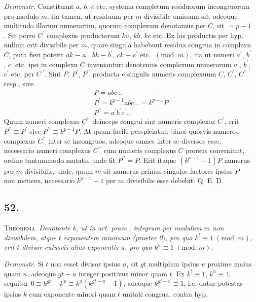 \documentclass[twoside,12pt]{memoir}
\renewcommand{\pmod}[1]{\;(\textrm{mod.}\;#1)}
\begin{document}
\textit{Demonstr.} Constituant \(a\), \(b\), \(c\) etc. systema completum residuorum incongruorum pro modulo \(m\), ita tamen, ut residuum per \(m\) divisibile omissum sit, adeoque multitudo illorum numerorum, quorum complexum denotamus per \(C\), sit \(=p-1\). Sit porro \(C^{\prime}\) complexus productorum \(k a\), \(k b\), \(k c\) etc. Ex his productis per hyp. nullum erit divisibile per \(m\), quare singula habebunt residua congrua in complexu \(C\), puta fieri poterit \(a k \equiv a^{\prime}\), \(b k \equiv b^{\prime}\), \(c k \equiv c^{\prime}\) etc. \(\pmod{m}\), ita ut numeri \(a^{\prime}\), \(b^{\prime}\), \(c^{\prime}\) etc. ipsi in complexu \(C\) inveniantur: denotemus complexum numerorum \(a^{\prime}\), \(b^{\prime}\), \(c^{\prime}\) etc. per \(C^{\prime \prime}\). Sint \(P\), \(P^{\prime}\), \(P^{\prime \prime}\) producta e singulis numeris complexuum \(C\), \(C^{\prime}\), \(C^{\prime \prime}\) resp., sive
\[\begin{aligned}
& P=a b c \ldots \\
& P^{\prime}=k^{p-1} a b c \ldots=k^{p-1} P \\
& P^{\prime \prime}=a^{\prime} b^{\prime} c^{\prime} \ldots
\end{aligned}\]
Quum numeri complexus \(C^{\prime \prime}\) deinceps congrui sint numeris complexus \(C^{\prime}\), erit \(P^{\prime \prime} \equiv P^{\prime}\) sive \(P^{\prime \prime} \equiv k^{p-1} P\). At quum facile perspiciatur, binos quosvis numeros complexus \(C^{\prime \prime}\) inter se incongruos, adeoque omnes inter se diversos esse, necessario numeri complexus \(C^{\prime \prime}\) cum numeris complexus \(C\) prorsus conveniunt, ordine tantummodo mutato, unde fit \(P^{\prime \prime}=P\). Erit itaque \((k^{p-1}-1) P\) numerus per \(m\) divisibilis, unde, quum \(m\) sit numerus primus singulos factores ipsius \(P\) non metiens, necessario \(k^{p-1}-1\) per \(m\) divisibilis esse debebit. Q. E. D.

\subsection*{52.}
 
\textsc{Theorema.} \textit{Denotante \(k\), ut in art. praec., integrum per modulum \(m\) non divisibilem, atque \(t\) exponentem minimum (praeter 0\()\), pro quo \(k^{t} \equiv 1\pmod{m}\), erit \(t\) divisor cuiusvis alius exponentis \(u\), pro quo \(k^{u} \equiv 1\pmod{m}\).}\pagebreak%
 
\textit{Demonstr.} Si \(t\) non esset divisor ipsius \(u\), sit \(g t\) multiplum ipsius \(u\) proxime maius quam \(u\), adeoque \(g t-u\) integer positivus minor quam \(t\). Ex \(k^{t} \equiv 1\), \(k^{u} \equiv 1\), sequitur \(0 \equiv k^{g t}-k^{u} \equiv k^{u}(k^{g t-u}-1)\), adeoque \(k^{g t-u} \equiv 1\), i.e. datur potestas ipsius \(k\) cum exponente minori quam \(t\) unitati congrua, contra hyp.
 
\end{document}
